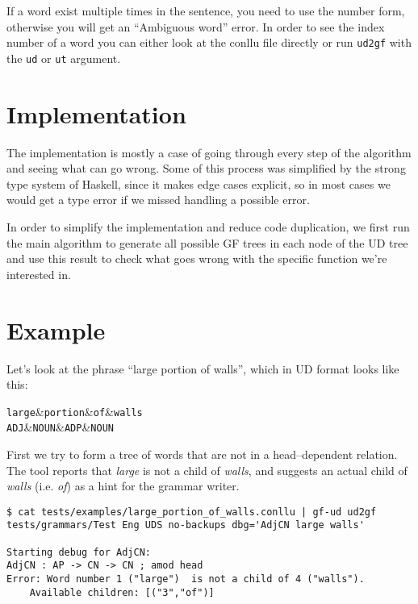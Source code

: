 If a word exist multiple times in the sentence, you need to use the number form, otherwise you will get an ``Ambiguous word'' error. In order to see the index number of a word you can either look at the conllu file directly or run \verb|ud2gf| with the \verb|ud| or \verb|ut| argument.


\section{Implementation}

The implementation is mostly a case of going through every step of the algorithm and seeing what can go wrong. Some of this process was simplified by the strong type system of Haskell, since it makes edge cases explicit, so in most cases we would get a type error if we missed handling a possible error.

In order to simplify the implementation and reduce code duplication, we first run the main algorithm to generate all possible GF trees in each node of the UD tree and use this result to check what goes wrong with the specific function we're interested in.

\section{Example}

Let's look at the phrase ``large portion of walls'', which in UD format looks like this:

\begin{center}
    \begin{dependency}
        \begin{deptext}[column sep=0.4cm]
              {\tt large}\&{\tt portion}\&{\tt of}\&{\tt walls}\\
            {\tt ADJ}\&{\tt NOUN}\&{\tt ADP}\&{\tt NOUN}\\
        \end{deptext}
    \end{dependency}
\end{center}
    
First we try to form a tree of words that are not in a head--dependent relation. The tool reports that \emph{large} is not a child of \emph{walls}, and suggests an actual child of \emph{walls} (i.e. \emph{of}) as a hint for the grammar writer.

\begin{lstlisting}
$ cat tests/examples/large_portion_of_walls.conllu | gf-ud ud2gf tests/grammars/Test Eng UDS no-backups dbg='AdjCN large walls'

Starting debug for AdjCN:
AdjCN : AP -> CN -> CN ; amod head
Error: Word number 1 ("large")  is not a child of 4 ("walls").
    Available children: [("3","of")]
\end{lstlisting}

